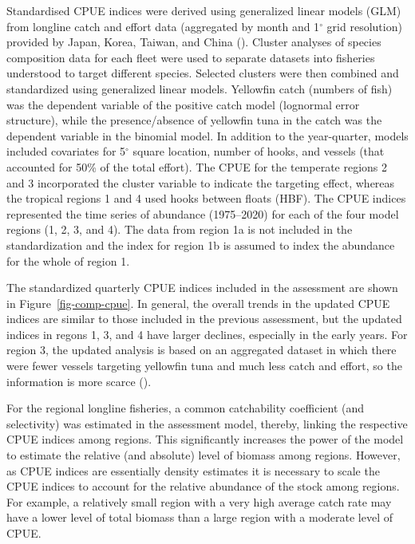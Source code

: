 \documentclass[
]{scrartcl}
\begin{document}
Standardised CPUE indices were derived using generalized linear models
(GLM) from longline catch and effort data (aggregated by month and
1\(^\circ\) grid resolution) provided by Japan, Korea, Taiwan, and China
().
Cluster analyses of species composition data for each fleet were used to
separate datasets into fisheries understood to target different species.
Selected clusters were then combined and standardized using generalized
linear models. Yellowfin catch (numbers of fish) was the dependent
variable of the positive catch model (lognormal error structure), while
the presence/absence of yellowfin tuna in the catch was the dependent
variable in the binomial model. In addition to the year-quarter, models
included covariates for 5\(^\circ\) square location, number of hooks,
and vessels (that accounted for 50\% of the total effort). The CPUE for
the temperate regions 2 and 3 incorporated the cluster variable to
indicate the targeting effect, whereas the tropical regions 1 and 4 used
hooks between floats (HBF). The CPUE indices represented the time series
of abundance (1975--2020) for each of the four model regions (1, 2, 3,
and 4). The data from region 1a is not included in the standardization
and the index for region 1b is assumed to index the abundance for the
whole of region 1.

The standardized quarterly CPUE indices included in the assessment are
shown in Figure~\ref{fig-comp-cpue}. In general, the overall trends in
the updated CPUE indices are similar to those included in the previous
assessment, but the updated indices in regons 1, 3, and 4 have larger
declines, especially in the early years. For region 3, the updated
analysis is based on an aggregated dataset in which there were fewer
vessels targeting yellowfin tuna and much less catch and effort, so the
information is more scarce
().

For the regional longline fisheries, a common catchability coefficient
(and selectivity) was estimated in the assessment model, thereby,
linking the respective CPUE indices among regions. This significantly
increases the power of the model to estimate the relative (and absolute)
level of biomass among regions. However, as CPUE indices are essentially
density estimates it is necessary to scale the CPUE indices to account
for the relative abundance of the stock among regions. For example, a
relatively small region with a very high average catch rate may have a
lower level of total biomass than a large region with a moderate level
of CPUE.
\end{document}
